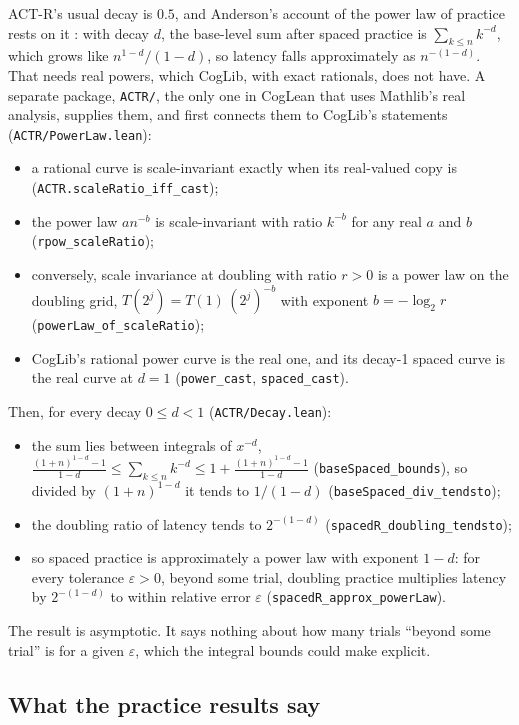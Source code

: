 \documentclass[11pt]{article}
\newcommand{\code}[1]{\texttt{#1}}
\newcommand{\lean}[1]{\texttt{#1}}
\begin{document}
ACT-R's usual decay is $0.5$, and Anderson's account of the power law of practice rests on it \citep{anderson1991,anderson1998}: with decay $d$, the base-level sum after spaced practice is $\sum_{k \le n} k^{-d}$, which grows like $n^{1-d}/(1-d)$, so latency falls approximately as $n^{-(1-d)}$. That needs real powers, which CogLib, with exact rationals, does not have. A separate package, \code{ACTR/}, the only one in CogLean that uses Mathlib's real analysis, supplies them, and first connects them to CogLib's statements (\code{ACTR/PowerLaw.lean}):
\begin{itemize}
  \item a rational curve is scale-invariant exactly when its real-valued copy is (\lean{ACTR.scaleRatio\_iff\_cast});
  \item the power law $a n^{-b}$ is scale-invariant with ratio $k^{-b}$ for any real $a$ and $b$ (\lean{rpow\_scaleRatio});
  \item conversely, scale invariance at doubling with ratio $r > 0$ is a power law on the doubling grid, $T(2^j) = T(1)\,(2^j)^{-b}$ with exponent $b = -\log_2 r$ (\lean{powerLaw\_of\_scaleRatio});
  \item CogLib's rational power curve is the real one, and its decay-1 spaced curve is the real curve at $d = 1$ (\lean{power\_cast}, \lean{spaced\_cast}).
\end{itemize}
Then, for every decay $0 \le d < 1$ (\code{ACTR/Decay.lean}):
\begin{itemize}
  \item the sum lies between integrals of $x^{-d}$, $\frac{(1+n)^{1-d} - 1}{1-d} \le \sum_{k \le n} k^{-d} \le 1 + \frac{(1+n)^{1-d} - 1}{1-d}$ (\lean{baseSpaced\_bounds}), so divided by $(1+n)^{1-d}$ it tends to $1/(1-d)$ (\lean{baseSpaced\_div\_tendsto});
  \item the doubling ratio of latency tends to $2^{-(1-d)}$ (\lean{spacedR\_doubling\_tendsto});
  \item so spaced practice is approximately a power law with exponent $1-d$: for every tolerance $\varepsilon > 0$, beyond some trial, doubling practice multiplies latency by $2^{-(1-d)}$ to within relative error $\varepsilon$ (\lean{spacedR\_approx\_powerLaw}).
\end{itemize}
The result is asymptotic. It says nothing about how many trials ``beyond some trial'' is for a given $\varepsilon$, which the integral bounds could make explicit.

\subsection{What the practice results say}
\end{document}
